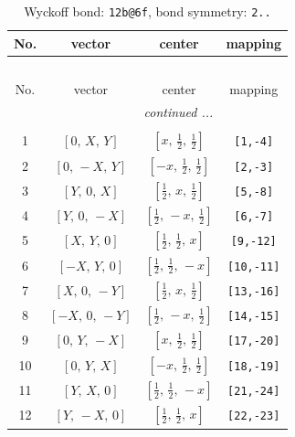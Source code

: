 \documentclass[fleqn,8pt]{jsarticle}
\begin{document}
\renewcommand{\arraystretch}{1.2}
\begin{longtable}{cccc}
\caption{Wyckoff bond: {\tt 12b@6f}, bond symmetry: {\tt 2..}}
 \\
 \hline \hline
No. & vector & center & mapping \\ \hline \endfirsthead

\multicolumn{3}{l}{\tablename\ \thetable{}} \\
 \hline \hline
No. & vector & center & mapping \\ \hline \endhead

 \hline \hline
\multicolumn{3}{r}{\footnotesize\it continued ...} \\ \endfoot

 \hline \hline
\multicolumn{3}{r}{} \\ \endlastfoot

1 & $\left[ 0,\, X,\, Y \right]$ & $\left[ x,\, \frac{1}{2},\, \frac{1}{2} \right]$ & {\tt [1,-4]} \\ \hline
2 & $\left[ 0,\, - X,\, Y \right]$ & $\left[ - x,\, \frac{1}{2},\, \frac{1}{2} \right]$ & {\tt [2,-3]} \\ \hline
3 & $\left[ Y,\, 0,\, X \right]$ & $\left[ \frac{1}{2},\, x,\, \frac{1}{2} \right]$ & {\tt [5,-8]} \\ \hline
4 & $\left[ Y,\, 0,\, - X \right]$ & $\left[ \frac{1}{2},\, - x,\, \frac{1}{2} \right]$ & {\tt [6,-7]} \\ \hline
5 & $\left[ X,\, Y,\, 0 \right]$ & $\left[ \frac{1}{2},\, \frac{1}{2},\, x \right]$ & {\tt [9,-12]} \\ \hline
6 & $\left[ - X,\, Y,\, 0 \right]$ & $\left[ \frac{1}{2},\, \frac{1}{2},\, - x \right]$ & {\tt [10,-11]} \\ \hline
7 & $\left[ X,\, 0,\, - Y \right]$ & $\left[ \frac{1}{2},\, x,\, \frac{1}{2} \right]$ & {\tt [13,-16]} \\ \hline
8 & $\left[ - X,\, 0,\, - Y \right]$ & $\left[ \frac{1}{2},\, - x,\, \frac{1}{2} \right]$ & {\tt [14,-15]} \\ \hline
9 & $\left[ 0,\, Y,\, - X \right]$ & $\left[ x,\, \frac{1}{2},\, \frac{1}{2} \right]$ & {\tt [17,-20]} \\ \hline
10 & $\left[ 0,\, Y,\, X \right]$ & $\left[ - x,\, \frac{1}{2},\, \frac{1}{2} \right]$ & {\tt [18,-19]} \\ \hline
11 & $\left[ Y,\, X,\, 0 \right]$ & $\left[ \frac{1}{2},\, \frac{1}{2},\, - x \right]$ & {\tt [21,-24]} \\ \hline
12 & $\left[ Y,\, - X,\, 0 \right]$ & $\left[ \frac{1}{2},\, \frac{1}{2},\, x \right]$ & {\tt [22,-23]} \\
\end{longtable}
\end{document}
